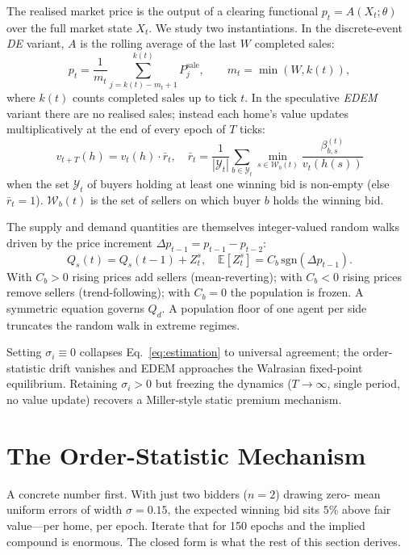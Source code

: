 \documentclass{article}
\begin{document}
The realised market price is the output of a clearing functional
$p_t = A(X_t;\theta)$ over the full market state $X_t$. We study
two instantiations. In the discrete-event \emph{DE} variant, $A$ is
the rolling average of the last $W$ completed sales:
\begin{equation}
\label{eq:price-rolling}
p_{t} = \frac{1}{m_{t}}\sum_{j=k(t)-m_{t}+1}^{k(t)} P^{\mathrm{sale}}_{j},
\qquad m_{t} = \min(W, k(t)),
\end{equation}
where $k(t)$ counts completed sales up to tick $t$. In the
speculative \emph{EDEM} variant there are no realised sales; instead
each home's value updates multiplicatively at the end of every
epoch of $T$ ticks:
\begin{equation}
\label{eq:value-update}
v_{t+T}(h) = v_t(h)\cdot \bar r_t,
\quad
\bar r_t = \frac{1}{|\mathcal{Y}_t|}\sum_{b\in\mathcal{Y}_t}\min_{s\in\mathcal{W}_b(t)}\frac{\beta_{b,s}^{(t)}}{v_t(h(s))}
\end{equation}
when the set $\mathcal{Y}_t$ of buyers holding at least one winning
bid is non-empty (else $\bar r_t = 1$). $\mathcal{W}_b(t)$ is the
set of sellers on which buyer $b$ holds the winning bid.

The supply and demand quantities are themselves integer-valued
random walks driven by the price increment
$\Delta p_{t-1} = p_{t-1} - p_{t-2}$:
\begin{equation}
\label{eq:balancer}
Q_{s}(t) = Q_{s}(t-1) + Z^{s}_{t},
\quad
\mathbb{E}[Z^{s}_{t}] = C_{b}\,\mathrm{sgn}(\Delta p_{t-1}).
\end{equation}
With $C_{b} > 0$ rising prices add sellers (mean-reverting); with
$C_{b} < 0$ rising prices remove sellers (trend-following); with
$C_{b} = 0$ the population is frozen. A symmetric equation governs
$Q_d$. A population floor of one agent per side truncates the random
walk in extreme regimes.

Setting $\sigma_i \equiv 0$ collapses Eq.~\eqref{eq:estimation} to
universal agreement; the order-statistic drift vanishes and EDEM
approaches the Walrasian fixed-point equilibrium. Retaining
$\sigma_i > 0$ but freezing the dynamics ($T \to \infty$, single
period, no value update) recovers a Miller-style static premium
mechanism.

\section{The Order-Statistic Mechanism}
\label{sec:mechanism}

A concrete number first. With just two bidders ($n=2$) drawing zero-
mean uniform errors of width $\sigma = 0.15$, the expected winning
bid sits $5\%$ above fair value---per home, per epoch. Iterate that
for 150 epochs and the implied compound is enormous. The closed form
is what the rest of this section derives.
\end{document}
